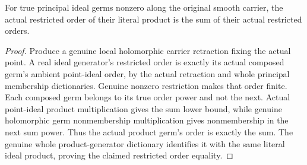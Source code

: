 \begin{lemma}
\label{hir:sharp-actual-principal-restricted-product-order-additivity}
\leanok
For true principal ideal germs nonzero along the original smooth carrier,
the actual restricted order of their literal product is the sum of
their actual restricted orders.
\end{lemma}
\begin{proof}
Produce a genuine local holomorphic carrier retraction fixing the actual
point. A real ideal generator's restricted order is exactly its actual
composed germ's ambient point-ideal order, by the actual retraction and
whole principal membership dictionaries. Genuine nonzero restriction
makes that order finite. Each composed germ belongs to its true order
power and not the next. Actual point-ideal product multiplication gives
the sum lower bound, while genuine holomorphic germ nonmembership
multiplication gives nonmembership in the next sum power. Thus the
actual product germ's order is exactly the sum. The genuine whole
product-generator dictionary identifies it with the same literal ideal
product, proving the claimed restricted order equality.
\end{proof}

